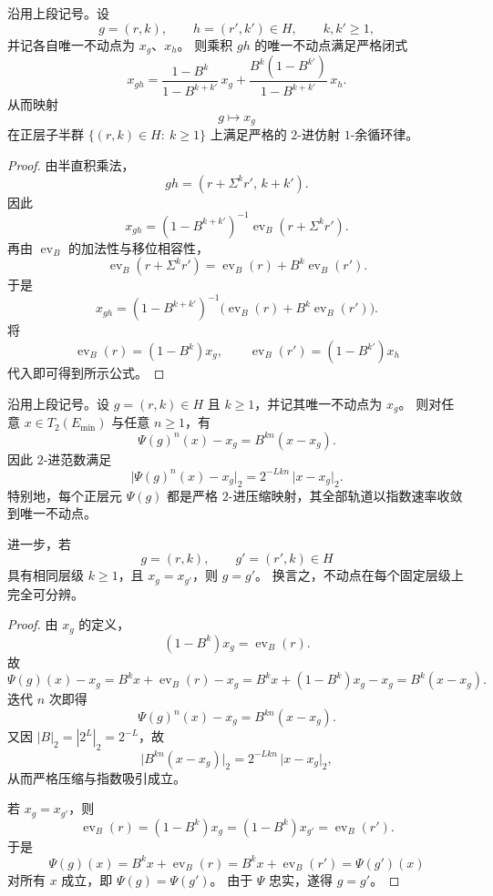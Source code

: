 \begin{theorem}\label{thm:xi-time-part9g-affine-fixed-point-cocycle}
沿用上段记号。设
\[
g=(r,k),\qquad h=(r',k')\in H,
\qquad k,k'\ge 1,
\]
并记各自唯一不动点为 \(x_g\)、\(x_h\)。
则乘积 \(gh\) 的唯一不动点满足严格闭式
\[
x_{gh}
=
\frac{1-B^k}{1-B^{k+k'}}\,x_g
+\frac{B^k(1-B^{k'})}{1-B^{k+k'}}\,x_h.
\]
从而映射
\[
g\longmapsto x_g
\]
在正层子半群
\(
\{(r,k)\in H:\ k\ge 1\}
\)
上满足严格的 \(2\)-进仿射 \(1\)-余循环律。
\end{theorem}
\begin{proof}
由半直积乘法，
\[
gh=(r+\Sigma^k r',\,k+k').
\]
因此
\[
x_{gh}
=(1-B^{k+k'})^{-1}\operatorname{ev}_B(r+\Sigma^k r').
\]
再由 \(\operatorname{ev}_B\) 的加法性与移位相容性，
\[
\operatorname{ev}_B(r+\Sigma^k r')
=\operatorname{ev}_B(r)+B^k\operatorname{ev}_B(r').
\]
于是
\[
x_{gh}
=(1-B^{k+k'})^{-1}
\bigl(\operatorname{ev}_B(r)+B^k\operatorname{ev}_B(r')\bigr).
\]
将
\[
\operatorname{ev}_B(r)=(1-B^k)x_g,
\qquad
\operatorname{ev}_B(r')=(1-B^{k'})x_h
\]
代入即可得到所示公式。
\end{proof}

\begin{theorem}[固定点的指数吸引与同层可分辨性]\label{thm:xi-time-part9g-affine-fixed-point-contraction-rigidity}
沿用上段记号。设 \(g=(r,k)\in H\) 且 \(k\ge 1\)，并记其唯一不动点为 \(x_g\)。
则对任意 \(x\in T_2(E_{\min})\) 与任意 \(n\ge 1\)，有
\[
\Psi(g)^n(x)-x_g=B^{kn}(x-x_g).
\]
因此 \(2\)-进范数满足
\[
\bigl|\Psi(g)^n(x)-x_g\bigr|_2
=
2^{-Lkn}\,\bigl|x-x_g\bigr|_2.
\]
特别地，每个正层元 \(\Psi(g)\) 都是严格 \(2\)-进压缩映射，其全部轨道以指数速率收敛到唯一不动点。

进一步，若
\[
g=(r,k),\qquad g'=(r',k)\in H
\]
具有相同层级 \(k\ge 1\)，且 \(x_g=x_{g'}\)，则 \(g=g'\)。
换言之，不动点在每个固定层级上完全可分辨。
\end{theorem}
\begin{proof}
由 \(x_g\) 的定义，
\[
(1-B^k)x_g=\operatorname{ev}_B(r).
\]
故
\[
\Psi(g)(x)-x_g
=B^k x+\operatorname{ev}_B(r)-x_g
=B^k x+(1-B^k)x_g-x_g
=B^k(x-x_g).
\]
迭代 \(n\) 次即得
\[
\Psi(g)^n(x)-x_g=B^{kn}(x-x_g).
\]
又因 \(|B|_2=|2^L|_2=2^{-L}\)，故
\[
\bigl|B^{kn}(x-x_g)\bigr|_2
=2^{-Lkn}\,\bigl|x-x_g\bigr|_2,
\]
从而严格压缩与指数吸引成立。

若 \(x_g=x_{g'}\)，则
\[
\operatorname{ev}_B(r)
=(1-B^k)x_g
=(1-B^k)x_{g'}
=\operatorname{ev}_B(r').
\]
于是
\[
\Psi(g)(x)=B^k x+\operatorname{ev}_B(r)
=B^k x+\operatorname{ev}_B(r')
=\Psi(g')(x)
\]
对所有 \(x\) 成立，即 \(\Psi(g)=\Psi(g')\)。
由于 \(\Psi\) 忠实，遂得 \(g=g'\)。
\end{proof}

